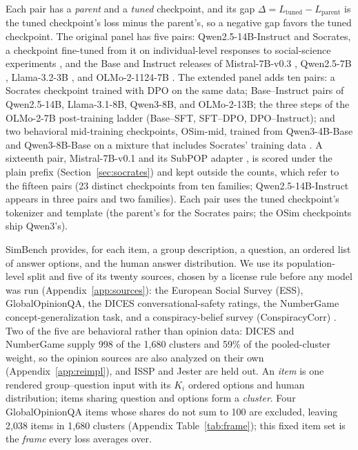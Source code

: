 \documentclass[11pt]{article}
\begin{document}
Each pair has a \emph{parent} and a \emph{tuned} checkpoint, and its gap $\Delta = L_{\mathrm{tuned}} - L_{\mathrm{parent}}$ is the tuned checkpoint's loss minus the parent's, so a negative gap favors the tuned checkpoint. The
original panel has five pairs: Qwen2.5-14B-Instruct and Socrates, a checkpoint
fine-tuned from it on individual-level responses to social-science experiments
\cite{qwen25technical,kolluri-etal-2025-finetuning}, and the Base and Instruct
releases of Mistral-7B-v0.3 \cite{jiang2023mistral}, Qwen2.5-7B
\cite{qwen25technical}, Llama-3.2-3B \cite{meta2024llama32}, and OLMo-2-1124-7B
\cite{olmo2024furious}. The extended panel adds ten pairs: a
Socrates checkpoint trained with DPO on the same data; Base--Instruct pairs of
Qwen2.5-14B, Llama-3.1-8B, Qwen3-8B, and OLMo-2-13B; the three steps of the
OLMo-2-7B post-training ladder (Base--SFT, SFT--DPO, DPO--Instruct); and two
behavioral mid-training checkpoints, OSim-mid, trained from Qwen3-4B-Base and
Qwen3-8B-Base on a mixture that includes Socrates' training data
\cite{zhou-etal-2026-odyssim}. A sixteenth pair, Mistral-7B-v0.1 and its SubPOP adapter \cite{suh2025subpop}, is scored under the plain prefix (Section~\ref{sec:socrates}) and kept outside the counts, which refer to the fifteen pairs (23 distinct checkpoints from ten families; Qwen2.5-14B-Instruct appears in three pairs and two families). Each pair uses the tuned checkpoint's tokenizer and template (the parent's for the Socrates pairs; the OSim checkpoints ship Qwen3's).

SimBench \cite{hu-etal-2026-simbench} provides, for each item, a group
description, a question, an ordered list of answer options, and the human
answer distribution. We use its population-level split and five of its
twenty sources, chosen by a license rule before any model was run (Appendix~\ref{app:sources}): the European Social Survey (ESS), GlobalOpinionQA, the
DICES conversational-safety ratings, the NumberGame concept-generalization
task, and a conspiracy-belief survey (ConspiracyCorr)
\cite{ess-round8-2016,ess-round9-2018,ess-round10-2020,durmus2024globalopinionqa,
aroyo2023dices,bigelow2016numbergame,enders2024conspiracism}. Two of the five are behavioral rather than opinion data: DICES and NumberGame supply 998 of the 1,680 clusters and 59\% of the pooled-cluster weight, so the opinion sources are also analyzed on their own (Appendix~\ref{app:reimpl}), and ISSP and Jester are held out. An \emph{item} is one rendered group--question input with its $K_i$ ordered options and human distribution; items sharing question and options form a \emph{cluster}. Four GlobalOpinionQA items whose shares do not sum to 100 are excluded, leaving 2,038 items in 1,680 clusters (Appendix Table~\ref{tab:frame}); this fixed item set is the \emph{frame} every loss averages over.
\end{document}
